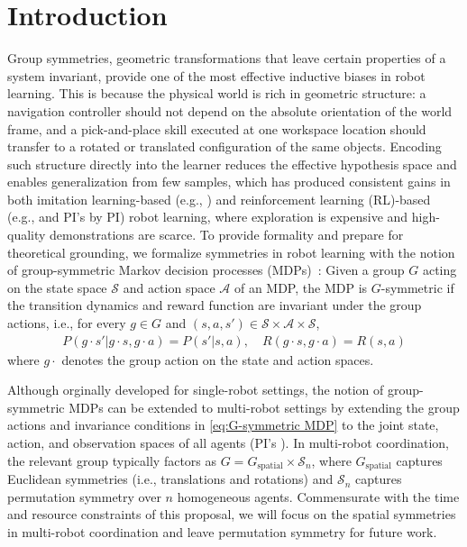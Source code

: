 \documentclass[11pt]{article}
\begin{document}
\section{Introduction}
Group symmetries, geometric transformations that leave certain properties of a system invariant, provide one of the most effective inductive biases in robot learning.
This is because the physical world is rich in geometric structure: a navigation controller should not depend on the absolute orientation of the world frame, and a pick-and-place skill executed at one workspace location should transfer to a rotated or translated configuration of the same objects.
Encoding such structure directly into the learner reduces the effective hypothesis space and enables generalization from few samples, which has produced consistent gains in both imitation learning-based (e.g., \citep{zeng2021transporter,wang2024equivariantdiffusion,seo2025survey}) and reinforcement learning (RL)-based (e.g., \citep{vanderpol2020mdp,wang2022so2} and PI's \citep{luo2024reinforcement} by PI) robot learning, where exploration is expensive and high-quality demonstrations are scarce.
To provide formality and prepare for theoretical grounding, we formalize symmetries in robot learning with the notion of group-symmetric Markov decision processes (MDPs)~\citep{vanderpol2020mdp,wang2022so2}:
Given a group $G$ acting on the state space $\mathcal{S}$ and action space $\mathcal{A}$ of an MDP, the MDP is $G$-symmetric if the transition dynamics and reward function are invariant under the group actions, i.e., for every $g\in G$ and
$(s,a,s')\in\mathcal{S}\times\mathcal{A}\times\mathcal{S}$,
\begin{align} \label{eq:G-symmetric MDP}
P(g \cdot s' | g \cdot s, g \cdot a) = P(s' | s, a), \quad R(g \cdot s, g \cdot a) = R(s, a)
\end{align}
where $g \cdot$ denotes the group action on the state and action spaces.

Although orginally developed for single-robot settings, the notion of group-symmetric MDPs can be extended to multi-robot settings by extending the group actions and invariance conditions in \eqref{eq:G-symmetric MDP} to the joint state, action, and observation spaces of all agents (PI's \citep{chen20243}).
In multi-robot coordination, the relevant group typically factors as $G = G_{\text{spatial}} \times \mathcal{S}_n$, where $G_{\text{spatial}}$ captures Euclidean symmetries (i.e., translations and rotations) and $\mathcal{S}_n$ captures permutation symmetry over $n$ homogeneous agents.
Commensurate with the time and resource constraints of this proposal, we will focus on the spatial symmetries in multi-robot coordination and leave permutation symmetry for future work. 
\end{document}
